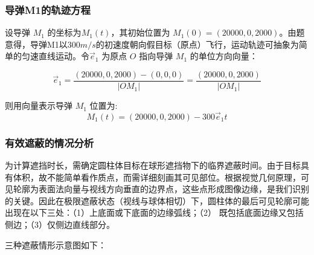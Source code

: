 \documentclass[withoutpreface,bwprint]{cumcmthesis}
\numberwithin{equation}{section} %
\numberwithin{figure}{section} %
\numberwithin{table}{section}  %
\begin{document}
\subsubsection{导弹M1的轨迹方程}

设导弹 $M_1$ 的坐标为$M_1(t)$，其初始位置为 $M_1(0) = (20000,0,2000)$。由题意得，导弹M1以$300m/s$的初速度朝向假目标（原点）飞行，运动轨迹可抽象为简单的匀速直线运动。令$\vec{e}_1$ 为原点 $O$ 指向导弹 $M_1$ 的单位方向向量：

\begin{equation}
    \vec{e}_1 = \frac{(20000,0,2000)-(0,0,0)}{|OM_1|}=\frac{(20000,0,2000)}{|OM_1|}
\end{equation}

则用向量表示导弹 $M_1$ 位置为:
\begin{equation}
    M_1(t) = (20000,0,2000) - 300\vec{e}_1 t
\end{equation}

\subsubsection{有效遮蔽的情况分析}
\label{sec:effective_shielding}

为计算遮挡时长，需确定圆柱体目标在球形遮挡物下的临界遮蔽时间。由于目标具有体积，故不能简单看作质点，而需详细刻画其可见部位。根据视觉几何原理，可见轮廓为表面法向量与视线方向垂直的边界点，这些点形成图像边缘，是我们识别的关键。因此在极限遮蔽状态（视线与球体相切）下，圆柱体的最后可见轮廓可能出现在以下三处：（1）上底面或下底面的边缘弧线；（2） 既包括底面边缘又包括侧边；（3）仅侧边直线部分。


三种遮蔽情形示意图如下：





\end{document}
